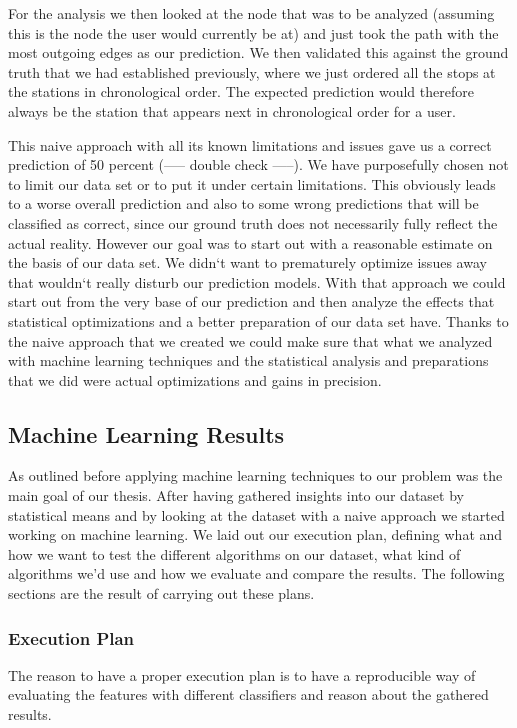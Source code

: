 For the analysis we then looked at the node that was to be analyzed (assuming this is the node the user would currently be at) and just took the path with the most outgoing edges as our prediction. We then validated this against the ground truth that we had established previously, where we just ordered all the stops at the stations in chronological order. The expected prediction would therefore always be the station that appears next in chronological order for a user. 

This naive approach with all its known limitations and issues gave us a correct prediction of 50 percent (----- double check -----). We have purposefully chosen not to limit our data set or to put it under certain limitations. This obviously leads to a worse overall prediction and also to some wrong predictions that will be classified as correct, since our ground truth does not necessarily fully reflect the actual reality. However our goal was to start out with a reasonable estimate on the basis of our data set. We didn`t want to prematurely optimize issues away that wouldn`t really disturb our prediction models. With that approach we could start out from the very base of our prediction and then analyze the effects that statistical optimizations and a better preparation of our data set have. Thanks to the naive approach that we created we could make sure that what we analyzed with machine learning techniques and the statistical analysis and preparations that we did were actual optimizations and gains in precision.

\subsection{Machine Learning Results}
\label{subsec:machine_learning_results}
As outlined before applying machine learning techniques to our problem was the main goal of our thesis. After having gathered insights into our dataset by statistical means and by looking at the dataset with a naive approach we started working on machine learning. We laid out our execution plan, defining what and how we want to test the different algorithms on our dataset, what kind of algorithms we'd use and how we evaluate and compare the results. The following sections are the result of carrying out these plans.

\subsubsection{Execution Plan}
The reason to have a proper execution plan is to have a reproducible way of evaluating the features with different classifiers and reason about the gathered results. 

